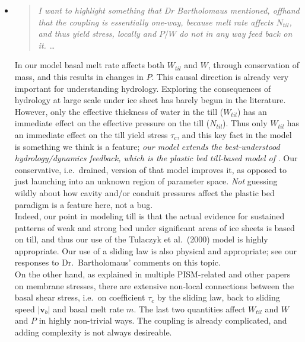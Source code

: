 \documentclass[11pt,reqno]{amsart}
\newcommand{\reply}[2]{
\medskip\medskip
\item  \begin{quote}
\emph{#1}
\end{quote}

\medskip
\noindent #2}
\begin{document}
\begin{itemize}
\reply{I want to highlight something that Dr Bartholomaus mentioned, offhand that the coupling is essentially one-way, because melt rate affects $N_{til}$, and thus yield stress, locally and $P/W$ do not in any way feed back on it. \dots}
{In our model basal melt rate affects both $W_{til}$ and $W$, through conservation of mass, and this results in changes in $P$.  This causal direction is already very important for understanding hydrology.  Exploring the consequences of hydrology at large scale under ice sheet has barely begun in the literature.\\
\indent However, only the effective thickness of water in the till ($W_{til}$) has an immediate effect on the effective pressure on the till ($N_{til}$).  Thus only $W_{til}$ has an immediate effect on the till yield stress $\tau_c$, and this key fact in the model is something we think is a feature; \emph{our model extends the best-understood hydrology/dynamics feedback, which is the plastic bed till-based model of} \cite{Tulaczyketal2000}.  Our conservative, i.e.~drained, version of that model improves it, as opposed to just launching into an unknown region of parameter space.  \emph{Not} guessing wildly about how cavity and/or conduit pressures affect the plastic bed paradigm is a feature here, not a bug. \\
\indent Indeed, our point in modeling till is that the actual evidence for sustained patterns of weak and strong bed under significant areas of ice sheets is based on till, and thus our use of the Tulaczyk et al.~(2000) \cite{Tulaczyketal2000} model is highly appropriate.  Our use of a sliding law is also physical and appropriate; see our responses to Dr.~Bartholomaus' comments on this topic. \\
\indent On the other hand, as explained in multiple PISM-related and other papers on membrane stresses, there are extensive non-local connections between the basal shear stress, i.e.~on coefficient $\tau_c$ by the sliding law, back to sliding speed $|\mathbf{v}_b|$ and basal melt rate $m$.  The last two quantities affect $W_{til}$ and $W$ and $P$ in highly non-trivial ways.  The coupling is already complicated, and adding complexity is not always desireable.}


\end{itemize}
\end{document}
